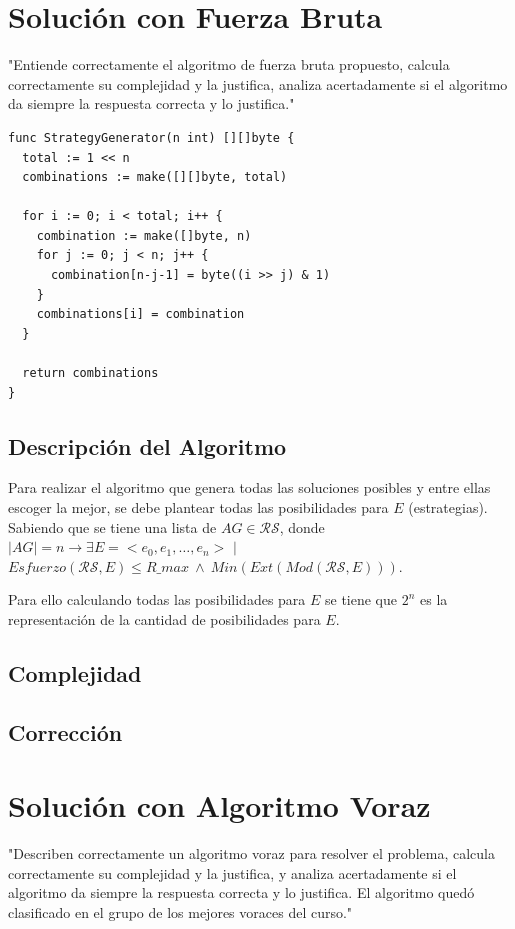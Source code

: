 \documentclass[letterpaper,10pt]{article}
\begin{document}
\section{Solución con Fuerza Bruta}
\label{sec:fuerza_bruta}
"Entiende correctamente el algoritmo de fuerza bruta propuesto, calcula correctamente su complejidad y la justifica, analiza acertadamente si el algoritmo da siempre la respuesta correcta y lo justifica."
\begin{lstlisting}[caption={Strategy Generator Code}, label={lst:strategy_generator}]
  func StrategyGenerator(n int) [][]byte {
  total := 1 << n
  combinations := make([][]byte, total)
  
  for i := 0; i < total; i++ {
    combination := make([]byte, n)
    for j := 0; j < n; j++ {
      combination[n-j-1] = byte((i >> j) & 1)
    }
    combinations[i] = combination
  }

  return combinations
}
\end{lstlisting}
\subsection{Descripción del Algoritmo}
\label{subsec:descripcion_fuerza_bruta}
Para realizar el algoritmo que genera todas las soluciones posibles y entre ellas escoger la mejor, se debe plantear todas las posibilidades para $E$ (estrategias). Sabiendo que se tiene una lista de $AG \in \mathcal{R}\mathcal{S}$, donde $|AG| = n \rightarrow \exists  E=<e_0,e_1,\ldots,e_n>$ $\mid$  $Esfuerzo(\mathcal{R}\mathcal{S},E)\leqslant R\_max ~ \wedge ~ Min(Ext(Mod(\mathcal{R}\mathcal{S},E))) $.

Para ello calculando todas las posibilidades para $E$ se tiene que $2^n$ es la representación de la cantidad de posibilidades para $E$.
\subsection{Complejidad}
\label{subsec:complejidad_fuerza_bruta}
\subsection{Corrección}
\label{subsec:correccion_fuerza_bruta}

\section{Solución con Algoritmo Voraz}
\label{sec:algoritmo_voraz}
"Describen correctamente un algoritmo voraz para resolver el problema, calcula correctamente su complejidad y la justifica, y analiza acertadamente si el algoritmo da siempre la respuesta correcta y lo justifica. El algoritmo quedó clasificado en el grupo de los mejores voraces del curso."
\end{document}
